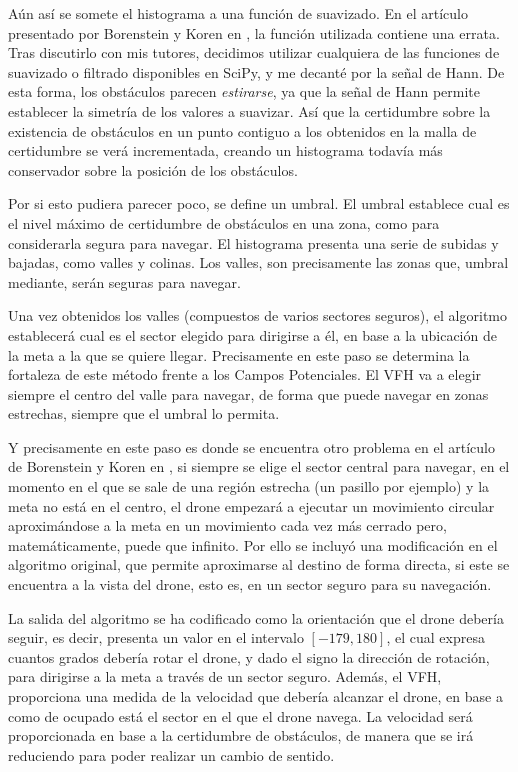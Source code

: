 Aún así se somete el histograma a una función de suavizado. En el artículo presentado por Borenstein y Koren en \citep{art:BorensteinKorenVFH}, la función utilizada contiene una errata. Tras discutirlo con mis tutores, decidimos utilizar cualquiera de las funciones de suavizado o filtrado disponibles en SciPy, y me decanté por la señal de Hann. 
De esta forma, los obstáculos parecen \textit{estirarse}, ya que la señal de Hann permite establecer la simetría de los valores a suavizar. Así que la certidumbre sobre la existencia de obstáculos en un punto contiguo a los obtenidos en la malla de certidumbre se verá incrementada, creando un histograma todavía más conservador sobre la posición de los obstáculos. 

Por si esto pudiera parecer poco, se define un umbral. El umbral establece cual es el nivel máximo de certidumbre de obstáculos en una zona, como para considerarla segura para navegar. 
El histograma presenta una serie de subidas y bajadas, como valles y colinas. Los valles, son precisamente las zonas que, umbral mediante, serán seguras para navegar.

Una vez obtenidos los valles (compuestos de varios sectores seguros), el algoritmo establecerá cual es el sector elegido para dirigirse a él, en base a la ubicación de la meta a la que se quiere llegar. 
Precisamente en este paso se determina la fortaleza de este método frente a los Campos Potenciales. El VFH va a elegir siempre el centro del valle para navegar, de forma que puede navegar en zonas estrechas, siempre que el umbral lo permita. 

Y precisamente en este paso es donde se encuentra otro problema en el artículo de Borenstein y Koren en \citep{art:BorensteinKorenVFH}, si siempre se elige el sector central para navegar, en el momento en el que se sale de una región estrecha (un pasillo por ejemplo) y la meta no está en el centro, el drone empezará a ejecutar un movimiento circular aproximándose a la meta en un movimiento cada vez más cerrado pero, matemáticamente, puede que infinito. Por ello se incluyó una modificación en el algoritmo original, que permite aproximarse al destino de forma directa, si este se encuentra a la vista del drone, esto es, en un sector seguro para su navegación.

La salida del algoritmo se ha codificado como la orientación que el drone debería seguir, es decir, presenta un valor en el intervalo $[-179, 180]$, el cual expresa cuantos grados debería rotar el drone, y dado el signo la dirección de rotación, para dirigirse a la meta a través de un sector seguro. 
Además, el VFH, proporciona una medida de la velocidad que debería alcanzar el drone, en base a como de ocupado está el sector en el que el drone navega. La velocidad será proporcionada en base a la certidumbre de obstáculos, de manera que se irá reduciendo para poder realizar un cambio de sentido.

